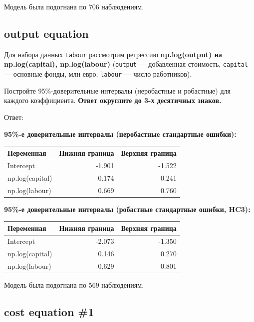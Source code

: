 \documentclass[
  russian,
]{article}
\newcounter{none} %
\begin{document}
Модель была подогнана по 706 наблюдениям.

\subsection{output equation}\label{output-equation}

Для набора данных \texttt{Labour} рассмотрим регрессию
\textbf{np.log(output) на np.log(capital), np.log(labour)}
(\texttt{output} --- добавленная стоимость, \texttt{capital} ---
основные фонды, млн евро; \texttt{labour} --- число работников).

Постройте 95\%-доверительные интервалы (неробастные и робастные) для
каждого коэффициента. \textbf{Ответ округлите до 3-х десятичных знаков.}

Ответ:

\textbf{95\%-е доверительные интервалы (неробастные стандартные
ошибки):}

{\def\LTcaptype{none} %
\begin{longtable}[]{@{}lrr@{}}
\toprule\noalign{}
Переменная & Нижняя граница & Верхняя граница \\
\midrule\noalign{}
\endhead
\bottomrule\noalign{}
\endlastfoot
Intercept & -1.901 & -1.522 \\
np.log(capital) & 0.174 & 0.241 \\
np.log(labour) & 0.669 & 0.760 \\
\end{longtable}
}

\textbf{95\%-е доверительные интервалы (робастные стандартные ошибки,
HC3):}

{\def\LTcaptype{none} %
\begin{longtable}[]{@{}lrr@{}}
\toprule\noalign{}
Переменная & Нижняя граница & Верхняя граница \\
\midrule\noalign{}
\endhead
\bottomrule\noalign{}
\endlastfoot
Intercept & -2.073 & -1.350 \\
np.log(capital) & 0.146 & 0.270 \\
np.log(labour) & 0.629 & 0.801 \\
\end{longtable}
}

Модель была подогнана по 569 наблюдениям.

\subsection{cost equation \#1}\label{cost-equation-1}
\end{document}
